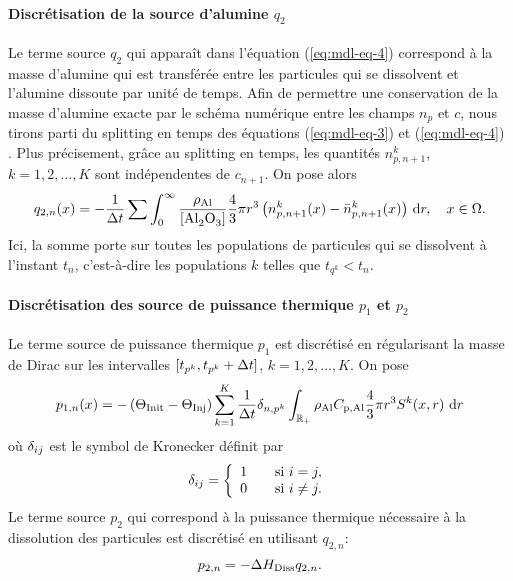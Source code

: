 \paragraph{Discrétisation de la source d'alumine $q_{2}$}
Le terme source $q_{2}$ qui apparaît dans l'équation
(\ref{eq:mdl-eq-4}) correspond à la masse d'alumine qui est transférée
entre les particules qui se dissolvent et l'alumine dissoute par unité
de temps. Afin de permettre une conservation de la masse d'alumine
exacte par le schéma numérique entre les champs $n_p$ et $c$, nous
tirons parti du splitting en temps des équations (\ref{eq:mdl-eq-3})
et (\ref{eq:mdl-eq-4}) \cite{Hofer2011}. Plus précisement, grâce au
splitting en temps, les quantités $n_{p,n+1}^k$, $k = 1, 2, \dots, K$
sont indépendentes de $c_{n+1}$. On pose alors
\begin{equation}
  q_{2,n}(x) = -\frac{1}{\dt} \sum%
  \int_{0}^\infty
  \frac{\aluminadensity}{[\ce{Al2O3}]} \frac{4}{3}\pi r^3
  \parent{n_{p,n+1}^k(x) - \bar n_{p,n+1}^k(x)} \intd{r}, \quad x\in\Omega.
\end{equation}
Ici, la somme porte sur toutes les populations de particules qui se
dissolvent à l'instant $t_n$, c'est-à-dire les populations $k$
telles que $t_{q^k} < t_n$.


\paragraph{Discrétisation des source de puissance thermique $p_1$ et
$p_2$} Le terme source de puissance thermique $p_1$ est discrétisé
en régularisant la masse de Dirac sur les intervalles $[t_{p^k},
  t_{p^k} + \Delta t]$, $k = 1, 2, \dots, K$. On pose
\begin{equation}
p_{1,n}(x) = -\left( \Theta_\text{Init} - \Theta_\text{Inj} \right)\sum_{k = 1}^K
\frac{1}{\Delta t}\delta_{n,p^k}\int_{\mathbb R_+} \rho_\mathrm{Al}C_{\mathrm{p,Al}}
\frac{4}{3}\pi r^3S^k(x, r)\,\,\mathrm dr
\end{equation}
où $\delta_{ij}$ est le symbol de Kronecker définit par
\begin{equation}
  \delta_{ij} = \left\{
  \begin{array}{ll}
    1&\quad\text{si } i = j,\\
    0&\quad\text{si } i\neq j.
  \end{array}\right.
\end{equation}
Le terme source $p_2$ qui correspond à la puissance thermique
nécessaire à la dissolution des particules est discrétisé en
utilisant $q_{2,n}$:
\begin{equation}
p_{2,n} = -\Delta H_\text{Diss} q_{2,n}.
\end{equation}

